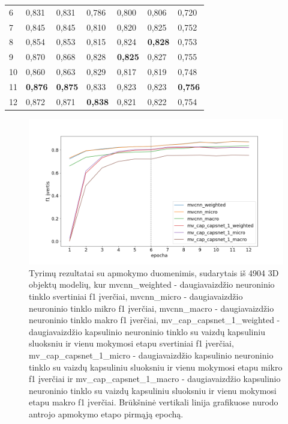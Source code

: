 \begin{table}[]
\begin{tabular}{l|l|l|l|l|l|l}
		6 &          0,831 &       0,831 &       0,786 &                     0,800 &                  0,806 &                  0,720 \\
		7 &          0,845 &       0,845 &       0,810 &                     0,820 &                  0,825 &                  0,752 \\
		8 &          0,854 &       0,853 &       0,815 &                     0,824 &                  \textbf{0,828} &                  0,753 \\
		9 &          0,870 &       0,868 &       0,828 &                     \textbf{0,825} &                  0,827 &                  0,755 \\
		10 &          0,860 &       0,863 &       0,829 &                     0,817 &                  0,819 &                  0,748 \\
		11 &          \textbf{0,876} &       \textbf{0,875} &       0,833 &                     0,823 &                  0,823 &                  \textbf{0,756} \\
		12 &          0,872 &       0,871 &       \textbf{0,838} &                     0,821 &                  0,822 &                  0,754 \\
	\end{tabular}
	\label{tbl:half_sample_f1}
\end{table}

\begin{figure}[H]
	\centering
	\includegraphics[scale=0.4]{img/half_sample_f1.png}
	\caption{
		Tyrimų rezultatai su apmokymo duomenimis, sudarytais iš 4904 3D objektų modelių, kur mvcnn\_weighted -  daugiavaizdžio neuroninio tinklo svertiniai f1 įverčiai, 
		mvcnn\_micro -  daugiavaizdžio neuroninio tinklo mikro f1 įverčiai, 
		mvcnn\_macro -  daugiavaizdžio neuroninio tinklo makro f1 įverčiai, 
		mv\_cap\_capsnet\_1\_weighted - daugiavaizdžio kapsulinio neuroninio tinklo su vaizdų kapsuliniu sluoksniu ir vienu mokymosi etapu svertiniai f1 įverčiai, 
		mv\_cap\_capsnet\_1\_micro - daugiavaizdžio kapsulinio neuroninio tinklo su vaizdų kapsuliniu sluoksniu ir vienu mokymosi etapu mikro f1 įverčiai ir
		mv\_cap\_capsnet\_1\_macro - daugiavaizdžio kapsulinio neuroninio tinklo su vaizdų kapsuliniu sluoksniu ir vienu mokymosi etapu makro f1 įverčiai. Brūkšninė vertikali linija grafikuose nurodo antrojo apmokymo etapo pirmąją epochą.
	}
	\label{img:half_sample_f1}
\end{figure}

